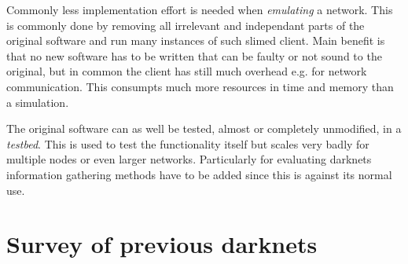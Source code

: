 Commonly less implementation effort is needed when \emph{emulating} a network. This is commonly done by removing all irrelevant and independant parts of the original software and run many instances of such slimed client. Main benefit is that no new software has to be written that can be faulty or not sound to the original, but in common the client has still much overhead e.g. for network communication. This consumpts much more resources in time and memory than a simulation.

The original software can as well be tested, almost or completely unmodified, in a \emph{testbed}. This is used to test the functionality itself but scales very badly for multiple nodes or even larger networks. Particularly for evaluating darknets information gathering methods have to be added since this is against its normal use.

\section{Survey of previous darknets}


